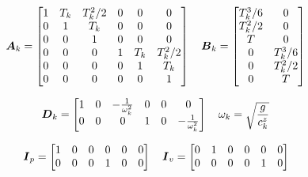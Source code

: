 \documentclass[12pt,a4paper]{article}
\begin{document}
\begin{equation*}
\mbox{\boldmath $A$}_k = 
\begin{bmatrix}
    1       & T_k   & T_k^2/2   & 0 & 0 & 0\\
    0       & 1     & T_k       & 0 & 0 & 0\\
    0       & 0     & 1         & 0 & 0 & 0\\
    0 & 0 & 0                   & 1       & T_k   & T_k^2/2   \\
    0 & 0 & 0                   & 0       & 1     & T_k       \\
    0 & 0 & 0                   & 0       & 0     & 1         \\
\end{bmatrix}
\quad
\mbox{\boldmath $B$}_k =
\begin{bmatrix}
    T_k^3/6 & 0\\
    T_k^2/2 & 0\\
    T       & 0\\
    0       & T_k^3/6 \\
    0       & T_k^2/2 \\
    0       & T       \\
\end{bmatrix}
\end{equation*}

\begin{equation*}
\mbox{\boldmath $D$}_{k} = 
\begin{bmatrix}
    1       & 0     & -\frac{1}{\omega_k^2} & 0 & 0 & 0\\
    0 & 0 & 0                               & 1       & 0     & -\frac{1}{\omega_k^2}  \\
\end{bmatrix}
\quad
\omega_k = \sqrt{\frac{g}{c^z_k}}
\end{equation*}

\begin{equation*}
\mbox{\boldmath $I$}_{p} = 
\begin{bmatrix} 
    1 & 0 & 0 & 0 & 0 & 0 \\
    0 & 0 & 0 & 1 & 0 & 0 
\end{bmatrix}
\quad
\mbox{\boldmath $I$}_{v} = 
\begin{bmatrix} 
    0 & 1 & 0 & 0 & 0 & 0 \\
    0 & 0 & 0 & 0 & 1 & 0 
\end{bmatrix}
\end{equation*}

\end{document}
